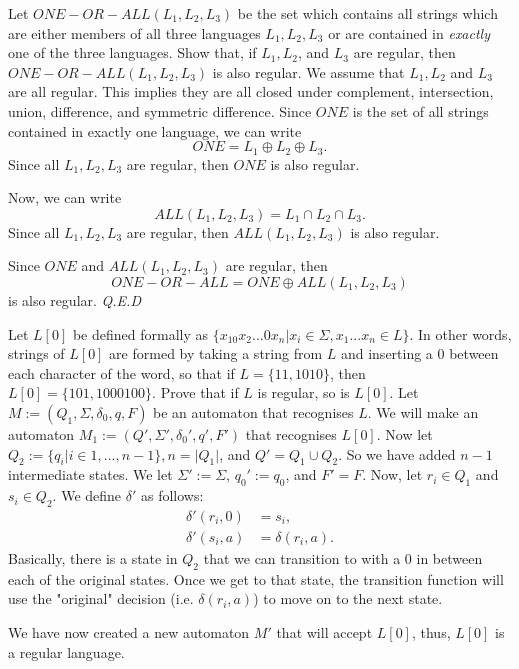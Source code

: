 \documentclass{article}
\begin{document}
\begin{question}{2}{
        Let $ONE-OR-ALL(L_1, L_2, L_3)$ be the set which contains all strings which are
        either members of all three languages $L_1, L_2, L_3$ or are contained in
        \emph{exactly} one of the three languages. Show that, if $L_1, L_2$, and $L_3$ are
        regular, then $ONE-OR-ALL(L_1, L_2, L_3)$ is also regular.
    }
    We assume that $L_1, L_2$ and $L_3$ are all regular. This implies they are all
    closed under complement, intersection, union, difference, and symmetric
    difference. Since $ONE$ is the set of all strings contained in exactly one language,
    we can write
    \[ONE = L_1 \oplus L_2 \oplus L_3.\]
    Since all $L_1, L_2, L_3$ are regular, then $ONE$ is also regular.

    Now, we can write
    \[ALL(L_1, L_2, L_3) = L_1 \cap L_2 \cap L_3.\]
    Since all $L_1, L_2, L_3$ are regular, then $ALL(L_1, L_2, L_3)$ is also regular.

    Since $ONE$ and $ALL(L_1, L_2, L_3)$ are regular, then
    \[ONE-OR-ALL = ONE \oplus ALL(L_1, L_2, L_3)\]
    is also regular. \hfill \textit{Q.E.D}
\end{question}

\begin{question}{3}{
        Let $L[0]$ be defined formally as $\{x_10x_2...0x_n | x_i \in \Sigma, x_1...x_n\in L\}$.
        In other words, strings of $L[0]$ are formed by taking a string from $L$
        and inserting a $0$ between each character of the word, so that if $L = \{11,1010\}$,
        then $L[0] = \{101, 1000100\}$.  Prove that if $L$ is regular, so is $L[0]$.
    }
    Let $M := (Q_1, \Sigma, \delta_0, q, F)$ be an automaton that recognises $L$. We will
    make an automaton $M_1 := (Q', \Sigma', \delta_0', q', F')$ that recognises $L[0]$. Now let
    $Q_2 := \{q_i | i \in 1,...,n-1\}, n = |Q_1|$, and $Q' = Q_1 \cup Q_2$. So we have added $n-1$
    intermediate states. We let $\Sigma' := \Sigma$, $q_0' := q_0$, and $F' = F$.
    Now, let $r_i \in Q_1$ and $s_i \in Q_2$. We define $\delta'$ as follows:
    \begin{align*}
        \delta'(r_i, 0) & = s_i,            \\
        \delta'(s_i, a) & = \delta(r_i, a).
    \end{align*}
    Basically, there is a state in $Q_2$ that we can transition to with a 0 in between each
    of the original states. Once we get to that state, the transition function will use the
    "original" decision (i.e. $\delta(r_i, a)$) to move on to the next state.

    We have now created a new automaton $M'$ that will accept $L[0]$, thus, $L[0]$ is a
    regular language.
\end{question}
\end{document}
